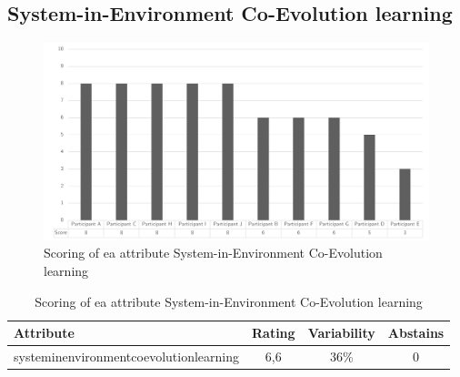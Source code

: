\subsection{System-in-Environment Co-Evolution learning}
\begin{figure}[H]
	\centering
	\includegraphics[width=0.9\linewidth]{images/scoreeasysteminenvironmentcoevolution}
	\caption[Scoring of \gls{ea} attribute System-in-Environment Co-Evolution learning]{Scoring of \gls{ea} attribute System-in-Environment Co-Evolution learning}
	\label{fig:appscoringeasysteminenvironmentcoevolutionlearning}
\end{figure}
\begin{table}[H]
	\centering
	\begin{tabular}{p{}ccc}
		\toprule
		\textbf{Attribute} & \textbf{Rating} & \textbf{Variability} & \textbf{Abstains} \\
		\midrule
		\Gls{systeminenvironmentcoevolutionlearning} & 6,6 & 36\% & 0 \\%
		\bottomrule
	\end{tabular}%
	\caption[Scoring of \gls{ea} attribute System-in-Environment Co-Evolution learning]{Scoring of \gls{ea} attribute System-in-Environment Co-Evolution learning}
	\label{tab:appscoringeasysteminenvironmentcoevolutionlearning}%
\end{table}%
\newpage
